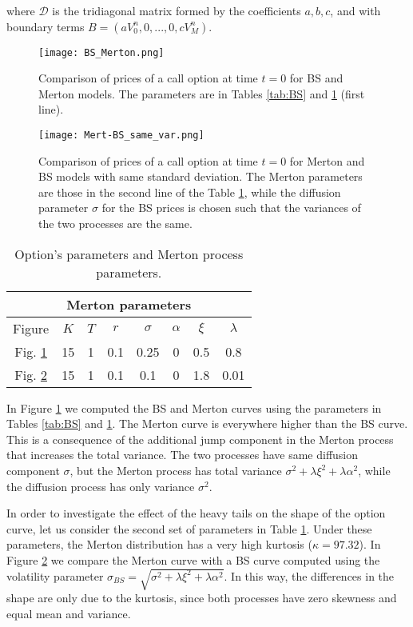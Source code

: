 where $\mathcal{D}$ is the tridiagonal matrix formed by the coefficients $a,b,c$, and with boundary terms $B = (a V^{n}_{0}, 0, ... , 0, c V^{n}_{M})$.  
\begin{figure}[t]
   \centering
   \texttt{[image: BS\_Merton.png]}
   \caption{Comparison of prices of a call option at time $t=0$ for BS and Merton models. The parameters are in Tables \ref{tab:BS} and \ref{tab:Mert} (first line).}
   \label{BS_Merton}
\end{figure}  
\begin{figure}[t]
   \centering
   \texttt{[image: Mert-BS\_same\_var.png]}
   \caption{Comparison of prices of a call option at time $t=0$ for Merton and BS models with same standard deviation. The Merton parameters are those in the second line of
   the Table \ref{tab:Mert}, while the diffusion parameter $\sigma$ for the BS prices is chosen such that the variances of the two processes are the same. }
   \label{BS_Merton2} 
 \end{figure}

\begin{table}[t]
  \centering
  \begin{tabular}{cccccccc}
  \toprule
  \multicolumn{8}{c}{Merton parameters} \\
  \midrule
  Figure & $K$ & $T$ & $r$ & $\sigma$ & $\alpha$ &$\xi$ & $\lambda$ \\
  \midrule
  Fig. \ref{BS_Merton} & 15 & 1 & 0.1 & 0.25 & 0 & 0.5 & 0.8 \\
  Fig. \ref{BS_Merton2} & 15 & 1 & 0.1 & 0.1 & 0 & 1.8 & 0.01 \\
  \bottomrule
  \end{tabular}
  \caption{Option's parameters and Merton process parameters.}
  \label{tab:Mert}
\end{table}
In Figure \ref{BS_Merton} we computed the BS and Merton curves using the parameters in Tables \ref{tab:BS} and \ref{tab:Mert}. 
The Merton curve is everywhere higher than the BS curve. 
This is a consequence 
of the additional jump component in the Merton process that increases the total variance. 
The two processes have same diffusion component $\sigma$, 
but the Merton process has total variance $\sigma^2 + \lambda \xi^2 +\lambda \alpha^2$, while the diffusion process has only variance $\sigma^2$.

In order to investigate the effect of the heavy tails on the shape of the option curve, let us consider the second set of parameters in Table \ref{tab:Mert}. 
Under these parameters, the Merton distribution has a very high kurtosis ($\kappa = 97.32$). 
In Figure \ref{BS_Merton2} we compare the Merton curve with a BS curve computed using the volatility parameter 
$\sigma_{BS} = \sqrt{\sigma^2 + \lambda \xi^2 +\lambda \alpha^2 }$. 
In this way, the differences in the shape are only due to the kurtosis, since both processes have zero skewness and equal mean and variance. 

